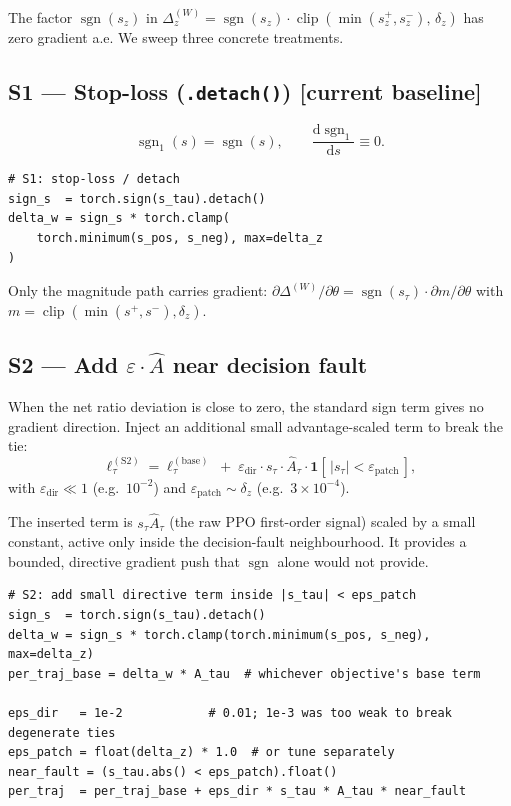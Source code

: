 \documentclass[11pt]{article}
\DeclareMathOperator*{\clip}{clip}
\DeclareMathOperator{\sign}{sgn}
\begin{document}
The factor $\sign(s_z)$ in
$\Delta_z^{(W)} = \sign(s_z)\cdot\clip(\min(s_z^+,s_z^-),\,\delta_z)$ has
zero gradient a.e. We sweep three concrete treatments.

\subsection{S1 --- Stop-loss (\texttt{.detach()}) [current baseline]}

\[
\sign_1(s) = \sign(s), \qquad \frac{\mathrm d \sign_1}{\mathrm d s} \equiv 0.
\]

\begin{lstlisting}
# S1: stop-loss / detach
sign_s  = torch.sign(s_tau).detach()
delta_w = sign_s * torch.clamp(
    torch.minimum(s_pos, s_neg), max=delta_z
)
\end{lstlisting}

Only the magnitude path carries gradient:
$\partial\Delta^{(W)}/\partial\theta = \sign(s_\tau)\cdot\partial m/\partial\theta$
with $m=\clip(\min(s^+,s^-),\delta_z)$.

\subsection{S2 --- Add $\varepsilon\cdot\hat A$ near decision fault}

When the net ratio deviation is close to zero, the standard sign term
gives no gradient direction. Inject an additional small advantage-scaled
term to break the tie:
\[
\ell_\tau^{(\text{S2})}
= \ell_\tau^{(\text{base})}
  \;+\; \varepsilon_{\text{dir}}\cdot s_\tau \cdot \hat A_\tau\cdot\mathbf 1[\,|s_\tau| < \varepsilon_{\text{patch}}\,],
\]
with $\varepsilon_{\text{dir}} \ll 1$ (e.g.\ $10^{-2}$) and
$\varepsilon_{\text{patch}} \sim \delta_z$ (e.g.\ $3\times 10^{-4}$).

The inserted term is $s_\tau\hat A_\tau$ (the raw PPO first-order signal)
scaled by a small constant, active only inside the decision-fault
neighbourhood. It provides a bounded, directive gradient push that
$\sign$ alone would not provide.

\begin{lstlisting}
# S2: add small directive term inside |s_tau| < eps_patch
sign_s  = torch.sign(s_tau).detach()
delta_w = sign_s * torch.clamp(torch.minimum(s_pos, s_neg), max=delta_z)
per_traj_base = delta_w * A_tau  # whichever objective's base term

eps_dir   = 1e-2            # 0.01; 1e-3 was too weak to break degenerate ties
eps_patch = float(delta_z) * 1.0  # or tune separately
near_fault = (s_tau.abs() < eps_patch).float()
per_traj  = per_traj_base + eps_dir * s_tau * A_tau * near_fault
\end{lstlisting}
\end{document}
